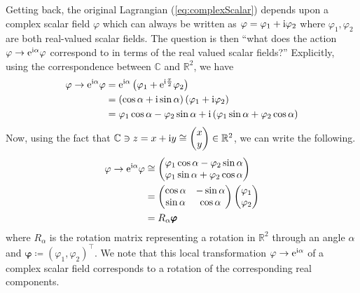 Getting back, the original Lagrangian (\ref{eq:complexScalar}) depends upon a
complex scalar field \(\varphi\) which can always be written as
\(\varphi = \varphi_1 + \mathrm{i}\varphi_2\) where \(\varphi_1, \varphi_2\) are both
real-valued scalar fields. The question is then ``what does the action
\(\varphi\to \mathrm{e}^{\mathrm{i}\alpha}\varphi\) correspond to in terms of the real valued
scalar fields?'' Explicitly, using the correspondence between \(\mathbb{C}\) and
\(\mathbb{R}^2\), we have
\begin{align*}
    \varphi \to \mathrm{e}^{\mathrm{i}\alpha}\varphi & = \mathrm{e}^{\mathrm{i}\alpha}\left(\varphi_1 + \mathrm{e}^{\mathrm{i}\frac{\pi}{2}}\varphi_2\right) \\
                                      & = \left(\cos{\alpha} + \mathrm{i} \sin{\alpha}\right)\left(\varphi_1 + \mathrm{i}\varphi_2\right) \\
                                      & = \varphi_1\cos{\alpha} - \varphi_2\sin{\alpha} + \mathrm{i}\left(\varphi_1\sin{\alpha} + \varphi_2\cos{\alpha}\right)
 \end{align*}
 Now, using the fact that \(\mathbb{C}\ni z = x + \mathrm{i} y\cong \begin{pmatrix}x\\y\end{pmatrix}\in\mathbb{R}^2\),
we can write the following.
 \begin{align*}
    \varphi\to\mathrm{e}^{\mathrm{i}\alpha}\varphi & \cong \begin{pmatrix} \varphi_1\cos{\alpha} - \varphi_2\sin{\alpha} \\ \varphi_1\sin{\alpha} + \varphi_2\cos{\alpha} \end{pmatrix} \\
                                    & = \begin{pmatrix} \cos{\alpha} & -\sin{\alpha} \\ \sin{\alpha} & \cos{\alpha} \end{pmatrix}\begin{pmatrix} \varphi_1 \\ \varphi_2 \end{pmatrix} \\
                                    & = R_\alpha\pmb{\varphi}
\end{align*}
where \(R_\alpha\) is the rotation matrix representing a rotation in
\(\mathbb{R}^2\) through an angle \(\alpha\) and \(\pmb{\varphi} \coloneqq (\varphi_1, \varphi_2)^\intercal\).
We note that this local transformation \(\varphi\to\mathrm{e}^{\mathrm{i}\alpha}\) of a complex
scalar field corresponds to a rotation of the corresponding real components.
